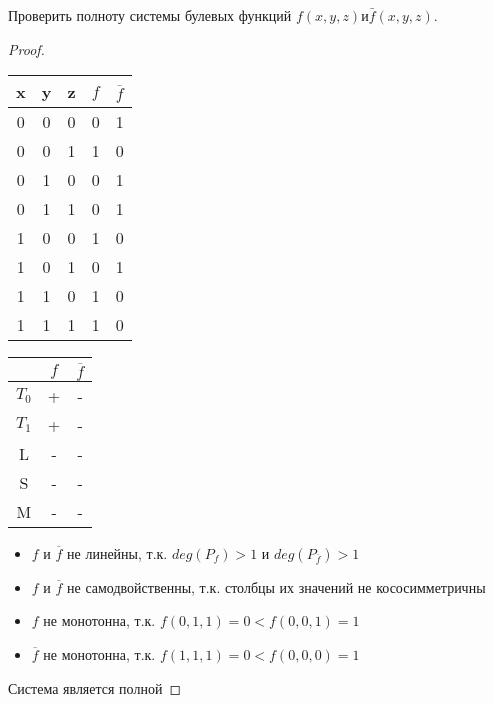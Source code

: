 \begin{problem}
Проверить полноту системы булевых функций  $f(x, y, z) и \bar{f}(x, y, z)$.
\end{problem}
\begin{proof} $ $\\
    \begin{table}[H]
    \begin{center}
    \begin{tabular}{|c|c|c|c|c|}
    \hline
    x & y & z & $f$ & $\overline{f}$\\
    \hline
    0 & 0 & 0   & 0 & 1\\
    0 & 0 & 1   & 1 & 0\\
    0 & 1 & 0   & 0 & 1\\
    0 & 1 & 1   & 0 & 1\\
    1 & 0 & 0   & 1 & 0\\
    1 & 0 & 1   & 0 & 1\\
    1 & 1 & 0   & 1 & 0\\
    1 & 1 & 1   & 1 & 0\\
    \hline
    \end{tabular}
    \end{center}
    \end{table}

    \begin{table}[H]
    \begin{center}
    \begin{tabular}{|c|c|c|}
    \hline
    & $f$ & $\overline{f}$\\
    \hline
    $T_0$ & + & -\\
    $T_1$ & + & -\\
    L & - & -   \\
    S & - & -   \\
    M & - & -   \\
    \hline
    \end{tabular}
    \end{center}
    \end{table}
    
    \begin{itemize}
    \item $f$ и $\overline{f}$ не линейны, т.к. $deg(P_f) > 1$ и $deg(P_{\overline{f}}) > 1$
    \item $f$ и $\overline{f}$ не самодвойственны, т.к. столбцы их значений не кососимметричны
    \item $f$ не монотонна, т.к. $f(0, 1, 1) = 0 < f(0, 0, 1) = 1$
    \item $\overline{f}$ не монотонна, т.к. $f(1, 1, 1) = 0 < f(0, 0, 0) = 1$
    \end{itemize}
    $ $\\
    Система является полной
\end{proof}

